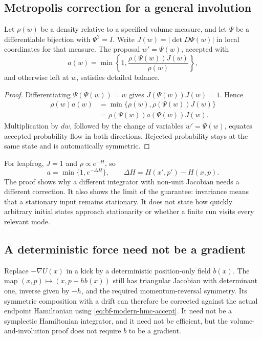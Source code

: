 \subsection{Metropolis correction for a general involution}

\begin{proposition}
\label{prop:bf-modern-involution}
Let $\rho(w)$ be a density relative to a specified volume measure, and let
$\Psi$ be a differentiable bijection with $\Psi^2=I$. Write
$J(w)=|\det D\Psi(w)|$ in local coordinates for that measure. The proposal
$w'=\Psi(w)$, accepted with
\begin{equation}
 a(w)=\min\left\{1,\frac{\rho(\Psi(w))J(w)}{\rho(w)}\right\},
 \label{eq:bf-modern-involution-accept}
\end{equation}
and otherwise left at $w$, satisfies detailed balance.
\end{proposition}

\begin{proof}
Differentiating $\Psi(\Psi(w))=w$ gives
$J(\Psi(w))J(w)=1$. Hence
\begin{align*}
 \rho(w)a(w)
 &=\min\{\rho(w),\rho(\Psi(w))J(w)\}\\
 &=\rho(\Psi(w))a(\Psi(w))J(w).
\end{align*}
Multiplication by $dw$, followed by the change of variables
$w'=\Psi(w)$, equates accepted probability flow in both directions. Rejected
probability stays at the same state and is automatically symmetric.
\end{proof}

For leapfrog, $J=1$ and $\rho\propto e^{-H}$, so
\begin{equation}
 a=\min\{1,e^{-\Delta H}\},\qquad
 \Delta H=H(x',p')-H(x,p).
 \label{eq:bf-modern-hmc-accept}
\end{equation}
The proof shows why a different integrator with non-unit Jacobian needs a
different correction. It also shows the limit of the guarantee: invariance
means that a stationary input remains stationary. It does not state how
quickly arbitrary initial states approach stationarity or whether a finite
run visits every relevant mode.

\subsection{A deterministic force need not be a gradient}

Replace $-\nabla U(x)$ in a kick by a deterministic position-only field
$b(x)$. The map $(x,p)\mapsto(x,p+h b(x))$ still has triangular Jacobian
with determinant one, inverse given by $-h$, and the required momentum-reversal
symmetry. Its symmetric composition with a drift can therefore be corrected
against the actual endpoint Hamiltonian using
\eqref{eq:bf-modern-hmc-accept}. It need not be a symplectic Hamiltonian
integrator, and it need not be efficient, but the volume-and-involution proof
does not require $b$ to be a gradient.


